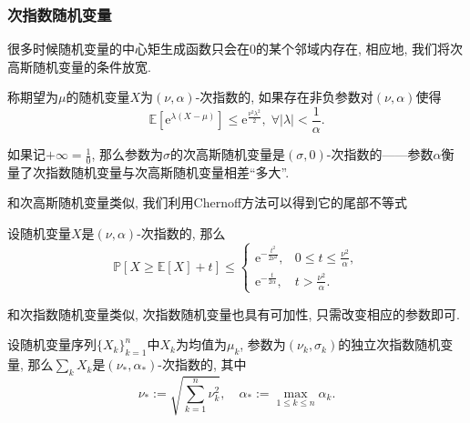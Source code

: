 \subsubsection{次指数随机变量}

很多时候随机变量的中心矩生成函数只会在$0$的某个邻域内存在, 相应地, 我们将次高斯随机变量的条件放宽. 
\begin{definition}[次指数随机变量]
	称期望为$\mu$的随机变量$X$为$(\nu, \alpha)$-次指数的, 如果存在非负参数对$(\nu, \alpha)$使得
	\begin{equation*}
		\mathbb{E}[ \mathrm{e}^{\lambda(X - \mu)} ] 
		\leq \mathrm{e}^{\frac{\nu^2 \lambda^2}{2}},\; 
		\forall |\lambda| < \frac{1}{\alpha}. 
	\end{equation*}
\end{definition}
\noindent
如果记$+\infty = \frac10$, 那么参数为$\sigma$的次高斯随机变量是$(\sigma, 0)$-次指数的——参数$\alpha$衡量了次指数随机变量与次高斯随机变量相差“多大”. 

和次高斯随机变量类似, 我们利用Chernoff方法可以得到它的尾部不等式
\begin{proposition}[次指数随机变量的上偏差不等式]\label{prop:UpperDeviationOfSubExpRV}
	设随机变量$X$是$(\nu, \alpha)$-次指数的, 那么
	\begin{equation*}
		\mathbb{P}[X \geq \mathbb{E}[X] + t] \leq 
		\begin{cases}
			\mathrm{e}^{-\frac{t^2}{2 \nu^2}}, & 0 \leq t \leq \frac{\nu^2}{\alpha}, \\
			\mathrm{e}^{-\frac{t}{2 \alpha}}, & t > \frac{\nu^2}{\alpha}.
		\end{cases}
	\end{equation*}
\end{proposition}

和次指数随机变量类似, 次指数随机变量也具有可加性, 只需改变相应的参数即可. 
\begin{proposition}
	设随机变量序列$\{X_k\}_{k=1}^n$中$X_k$为均值为$\mu_k$, 参数为$(\nu_k, \sigma_k)$的独立次指数随机变量, 那么$\sum_k X_k$是$(\nu_*, \alpha_*)$-次指数的, 其中
	\begin{equation*}
		\nu_* := \sqrt{\sum_{k=1}^n \nu_k^2}, \quad
		\alpha_* := \max_{1 \leq k \leq n} \alpha_k. 
	\end{equation*}
\end{proposition}


